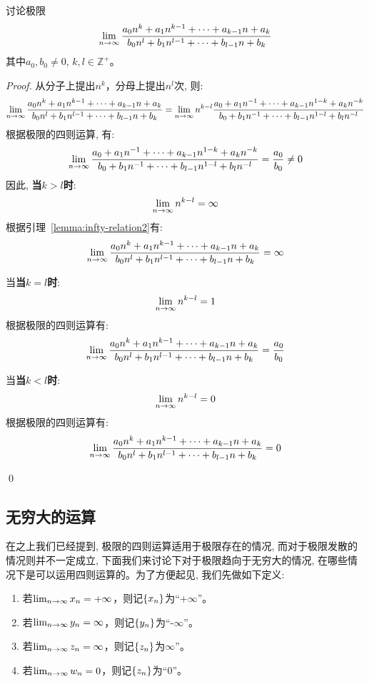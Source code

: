 \begin{example}
    讨论极限
    \begin{equation*}
        \lim_{n \to \infty } \frac{a_0 n^k + a_1 n^{k - 1} + \cdots + a_{k - 1} n + a_k}{b_0 n^l + b_1 n^{l - 1} + \cdots + b_{l - 1} n + b_k}
    \end{equation*}
    其中$a_0, b_0 \ne 0$, $k, l \in \mathbb{Z}^+$。
\end{example}
\begin{proof}
    从分子上提出$n^k$，分母上提出$n^l$次, 则:
    \def\tmp#1#2{#1_0+#1_1n^{-1}+\cdots+#1_{#2-1}n^{1-#2}+#1_{#2}n^{-#2}}
    \begin{equation*}
        \mylim{n}{\frac{\listsum{a}{n}{k}}{\listsum{b}{n}{l}}} = \mylim{n}{n^{k-l}\frac{\tmp{a}{k}}}{\tmp{b}{l}}
    \end{equation*}
    根据极限的四则运算, 有:
    \begin{equation*}
        \mylim{n}{\frac{\tmp{a}{k}}}{\tmp{b}{l}} = \frac{a_0}{b_0} \neq 0
    \end{equation*}
    因此, {\bf 当$k > l$时}:
    \begin{equation*}
        \lim_{n \to \infty } n^{k-l} = \infty
    \end{equation*}
    根据引理~\ref{lemma:infty-relation2}有:
    \begin{equation*}
        \lim_{n \to \infty } \frac{a_0 n^k + a_1 n^{k - 1} + \cdots + a_{k - 1} n + a_k}{b_0 n^l + b_1 n^{l - 1} + \cdots + b_{l - 1} n + b_k} = \infty
    \end{equation*}


    当{\bf 当$k = l$时}:
    \begin{equation*}
        \lim_{n \to \infty } n^{k-l} = 1
    \end{equation*}
    根据极限的四则运算有:
    \begin{equation*}
        \lim_{n \to \infty } \frac{a_0 n^k + a_1 n^{k - 1} + \cdots + a_{k - 1} n + a_k}{b_0 n^l + b_1 n^{l - 1} + \cdots + b_{l - 1} n + b_k} = \frac{a_0}{b_0}
    \end{equation*}

    当{\bf 当$k < l$时}:
    \begin{equation*}
        \lim_{n \to \infty } n^{k-l} = 0
    \end{equation*}
    根据极限的四则运算有:
    \begin{equation*}
        \lim_{n \to \infty } \frac{a_0 n^k + a_1 n^{k - 1} + \cdots + a_{k - 1} n + a_k}{b_0 n^l + b_1 n^{l - 1} + \cdots + b_{l - 1} n + b_k} = 0
    \end{equation*}

    \qed
\end{proof}
\subsection{无穷大的运算}
在之上我们已经提到, 极限的四则运算适用于极限存在的情况, 而对于极限发散的情况则并不一定成立, 下面我们来讨论下对于极限趋向于无穷大的情况, 在哪些情况下是可以运用四则运算的。为了方便起见, 我们先做如下定义:
\begin{enumerate}
    \item 若$\lim_{n \to \infty } x_n = +\infty$，则记$\left\{ x_n\right\}$为``+$\infty$''。
    \item 若$\lim_{n \to \infty } y_n = \infty$，则记$\left\{ y_n\right\}$为``-$\infty$''。
    \item 若$\lim_{n \to \infty } z_n = \infty$，则记$\left\{ z_n\right\}$为$\infty$''。
    \item 若$\lim_{n \to \infty } w_n = 0$，则记$\left\{ z_n\right\}$为``0''。
\end{enumerate}

